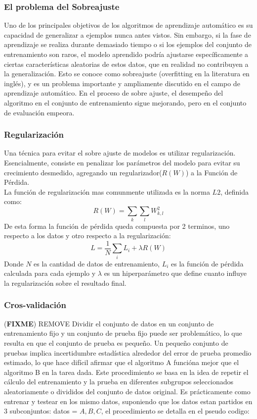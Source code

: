 \documentclass[a4paper,11pt,spanish]{book}
\newcommand*{\FIXME}[1]{{(\textbf{FIXME}) {#1}}}
\begin{document}
	\subsubsection {El problema del Sobreajuste}
	  Uno de los principales objetivos de los algoritmos de aprendizaje automático es su capacidad de generalizar a ejemplos nunca antes vistos. Sin embargo, si la fase
	  de aprendizaje se realiza durante demasiado tiempo o si los ejemplos del conjunto de entrenamiento son raros, el modelo aprendido podría ajustarse específicamente
	  a ciertas características aleatorias de estos datos, que en realidad no contribuyen a la generalización. Esto se conoce como sobreajuste (overfitting en la literatura en inglés),
	  y es un problema importante y ampliamente discutido en el campo de aprendizaje automático. En el proceso de sobre ajuste, el desempeño del algoritmo en el
	  conjunto de entrenamiento sigue mejorando, pero en el conjunto de evaluación empeora.

	\subsubsection {Regularización}
	  Una técnica para evitar el sobre ajuste de modelos es utilizar regularización. Esencialmente, consiste en penalizar los parámetros del modelo para evitar su
	  crecimiento desmedido, agregando un regularizador($R(W)$) a la Función de Pérdida. \\
	  La función de regularización mas comunmente utilizada es la norma $L2$, definida como:
	   \begin{equation}
	    R(W) = {\sum_{k} {\sum_{l}} W_{k,l}^2}
	   \end{equation}
	   De esta forma la función de pérdida queda compuesta por 2 terminos, uno respecto a los datos y otro respecto a la regularización:
	   \begin{equation}
	    L = {\frac{1}{N}} {\sum_{i} L_{i}} + {\lambda R(W)}
	   \end{equation}
	   Donde $N$ es la cantidad de datos de entrenamiento, $L_{i}$ es la función de pérdida calculada para cada ejemplo y ${\lambda}$ es un hiperparámetro que define
	   cuanto influye la regularización sobre el resultado final.

	\subsubsection {Cros-validación}\FIXME{REMOVE}
	  Dividir el conjunto de datos en un conjunto de entrenamiento fijo y un conjunto de prueba fijo puede ser problemático, lo que resulta en que el conjunto de prueba es pequeño.
	  Un pequeño conjunto de pruebas implica incertidumbre estadística alrededor del error de prueba promedio estimado, lo que hace difícil afirmar que el algoritmo A funcióna mejor que el algoritmo B en la tarea dada.
	  Este procedimiento se basa en la idea de repetir el cálculo del entrenamiento y la prueba en diferentes subgrupos seleccionados aleatoriamente o divididos del conjunto de datos original.
	  Es prácticamente como entrenar y testear en los mismo datos, suponiendo que los datos estan partidos en 3 subconjuntos: datos = ${A,B,C}$, el procedimiento se detalla en el pseudo codigo:
\end{document}
